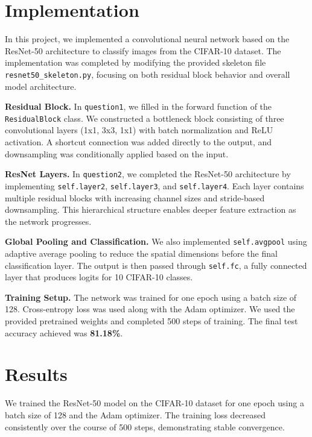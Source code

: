 \section{Implementation}
\label{sec:implementation}

In this project, we implemented a convolutional neural network based on the ResNet-50 architecture to classify images from the CIFAR-10 dataset. 
The implementation was completed by modifying the provided skeleton file \texttt{resnet50\_skeleton.py}, 
focusing on both residual block behavior and overall model architecture.

\textbf{Residual Block.} 
In \texttt{question1}, we filled in the forward function of the \texttt{ResidualBlock} class. 
We constructed a bottleneck block consisting of three convolutional layers (1x1, 3x3, 1x1) with batch normalization and ReLU activation. 
A shortcut connection was added directly to the output, and downsampling was conditionally applied based on the input.

\textbf{ResNet Layers.} 
In \texttt{question2}, we completed the ResNet-50 architecture by implementing \texttt{self.layer2}, \texttt{self.layer3}, and \texttt{self.layer4}. 
Each layer contains multiple residual blocks with increasing channel sizes and stride-based downsampling. 
This hierarchical structure enables deeper feature extraction as the network progresses.

\textbf{Global Pooling and Classification.} 
We also implemented \texttt{self.avgpool} using adaptive average pooling to reduce the spatial dimensions before the final classification layer. 
The output is then passed through \texttt{self.fc}, a fully connected layer that produces logits for 10 CIFAR-10 classes.

\textbf{Training Setup.} 
The network was trained for one epoch using a batch size of 128. 
Cross-entropy loss was used along with the Adam optimizer. 
We used the provided pretrained weights and completed 500 steps of training. 
The final test accuracy achieved was \textbf{81.18\%}.




\section{Results}
\label{sec:results}


We trained the ResNet-50 model on the CIFAR-10 dataset for one epoch using a batch size of 128 and the Adam optimizer. The training loss decreased consistently over the course of 500 steps, demonstrating stable convergence. 

